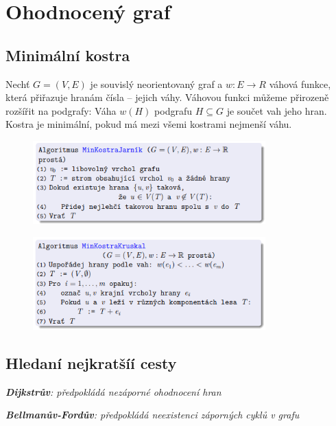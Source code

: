 \documentclass{szzclass}
\begin{document}
\section{Ohodnocený graf}
\subsection{Minimální kostra}
Nechť $G = (V , E)$ je souvislý neorientovaný graf a $w : E \rightarrow R$
váhová funkce, která přiřazuje hranám čísla – jejich váhy.
Váhovou funkci můžeme přirozeně rozšířit na podgrafy:
Váha $w(H)$ podgrafu $H \subseteq G$ je součet vah jeho hran.
Kostra je minimální, pokud má mezi všemi kostrami nejmenší
váhu.

\begin{figure}[h!]
\includegraphics[width=0.8\textwidth]{topics/bi-spol-4/images/jarnik.png}
\end{figure}

\begin{figure}[h!]
\includegraphics[width=0.8\textwidth]{topics/bi-spol-4/images/kruskal.png}
\end{figure}

\newpage

\subsection{Hledaní nejkratšíí cesty}
\textit{\textbf{Dijkstrův}: předpokládá nezáporné ohodnocení hran}

\textit{\textbf{Bellmanův-Fordův}: předpokládá neexistenci záporných cyklů v grafu}
\end{document}
